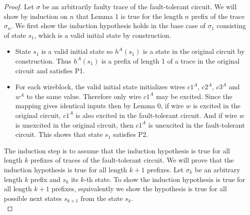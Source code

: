 \documentclass[12pt]{report}
\begin{document}
\begin{proof}
Let $\sigma$ be an arbitrarily faulty trace of the fault-tolerant circuit.  We will show by induction on $n$ that Lemma 1 is true for the length $n$ prefix of the trace $\sigma_n$.  
We first show the induction hypothesis holds in the base case of $\sigma_1$ consisting of state $s_1$, which is a valid initial state by construction.
\begin{itemize}
\item State $s_1$ is a valid initial state so $h^A(s_1)$ is a state in the original circuit by construction. %
 Thus $h^A(s_1)$ is a prefix of length 1 of a trace in the original circuit and satisfies P1.
\item 
For each wireblock, the valid initial state initializes wires $c1^A$, $c2^A$, $c3^A$ and $w^A$ to the same value.  Therefore only wire $c1^A$ may be excited.  Since the mapping gives identical inputs then by Lemma 0, if wire $w$ is excited in the original circuit, $c1^A$ is also excited in the fault-tolerant circuit.
And if wire $w$ is unexcited in the original circuit, then $c1^A$ is unexcited in the fault-tolerant circuit.  This shows that state $s_1$ satisfies P2.    %
\end{itemize}

The induction step is to assume that the induction hypothesis is true for all length $k$ prefixes of traces of the fault-tolerant circuit.  We will prove that the induction hypothesis is true for all length $k+1$ prefixes.  %
Let $\sigma_k$ be an arbitrary length $k$ prefix and $s_k$ its $k$-th state.  
To show the induction hypothesis is true for all length $k+1$ prefixes, equivalently we show the hypothesis is true for all possible next states $s_{k+1}$ from the state $s_k$.\\


\end{proof}
\end{document}
